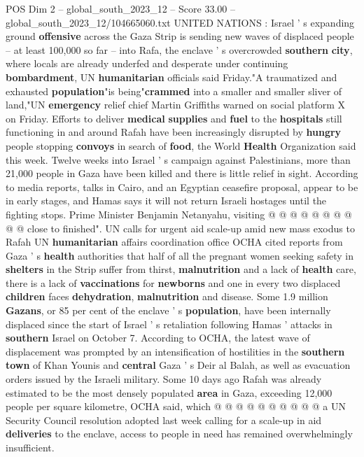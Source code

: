 \begin{textsample}{POS Dim 2 – global\_south\_2023\_12 – Score 33.00 – global\_south\_2023\_12/104665060.txt}  \label{ex:f2_pos_022}
UNITED NATIONS : Israel ' s expanding ground \textbf{offensive} across the Gaza Strip is sending new waves of displaced people -- at least 100,000 so far -- into Rafa, the enclave ' s overcrowded \textbf{southern} \textbf{city}, where locals are already underfed and desperate under continuing \textbf{bombardment}, UN \textbf{humanitarian} officials said Friday."A traumatized and exhausted \textbf{population}"is being"\textbf{crammed} into a smaller and smaller sliver of land,"UN \textbf{emergency} relief chief Martin Griffiths warned on social platform X on Friday.
Efforts to deliver \textbf{medical} \textbf{supplies} and \textbf{fuel} to the \textbf{hospitals} still functioning in and around Rafah have been increasingly disrupted by \textbf{hungry} people stopping \textbf{convoys} in search of \textbf{food}, the World \textbf{Health} Organization said this week.
Twelve weeks into Israel ' s campaign against Palestinians, more than 21,000 people in Gaza have been killed and there is little relief in sight.
According to media reports, talks in Cairo, and an Egyptian ceasefire proposal, appear to be in early stages, and Hamas says it will not return Israeli hostages until the fighting stops.
Prime Minister Benjamin Netanyahu, visiting @ @ @ @ @ @ @ @ @ @ close to finished".
UN calls for urgent aid scale-up amid new mass exodus to Rafah UN \textbf{humanitarian} affairs coordination office OCHA cited reports from Gaza ' s \textbf{health} authorities that half of all the pregnant women seeking safety in \textbf{shelters} in the Strip suffer from thirst, \textbf{malnutrition} and a lack of \textbf{health} care, there is a lack of \textbf{vaccinations} for \textbf{newborns} and one in every two displaced \textbf{children} faces \textbf{dehydration}, \textbf{malnutrition} and disease.
Some 1.9 million \textbf{Gazans}, or 85 per cent of the enclave ' s \textbf{population}, have been internally displaced since the start of Israel ' s retaliation following Hamas ' attacks in \textbf{southern} Israel on October 7.
According to OCHA, the latest wave of displacement was prompted by an intensification of hostilities in the \textbf{southern} \textbf{town} of Khan Younis and \textbf{central} Gaza ' s Deir al Balah, as well as evacuation orders issued by the Israeli military.
Some 10 days ago Rafah was already estimated to be the most densely populated \textbf{area} in Gaza, exceeding 12,000 people per square kilometre, OCHA said, which @ @ @ @ @ @ @ @ @ @ a UN Security Council resolution adopted last week calling for a scale-up in aid \textbf{deliveries} to the enclave, access to people in need has remained overwhelmingly insufficient.

\end{textsample}
